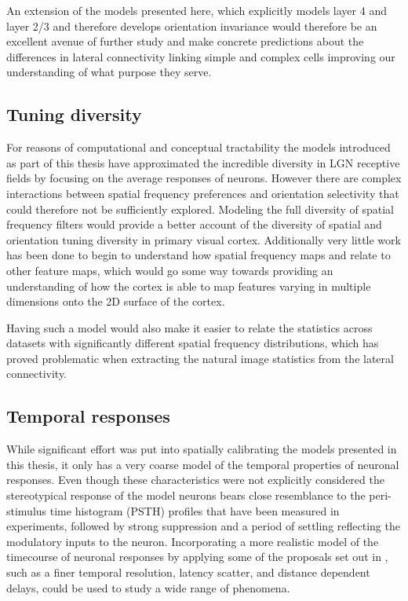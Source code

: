 An extension of the models presented here, which explicitly models
layer 4 and layer 2/3 and therefore develops orientation invariance
would therefore be an excellent avenue of further study and make
concrete predictions about the differences in lateral connectivity
linking simple and complex cells improving our understanding of what
purpose they serve.

\subsection{Tuning diversity}

For reasons of computational and conceptual tractability the models
introduced as part of this thesis have approximated the incredible
diversity in LGN receptive fields by focusing on the average responses
of neurons. However there are complex interactions between spatial
frequency preferences and orientation selectivity that could therefore
not be sufficiently explored. Modeling the full diversity of spatial
frequency filters would provide a better account of the diversity of
spatial and orientation tuning diversity in primary visual
cortex. Additionally very little work has been done to begin to
understand how spatial frequency maps and relate to other feature
maps, which would go some way towards providing an understanding of
how the cortex is able to map features varying in multiple dimensions
onto the 2D surface of the cortex.

Having such a model would also make it easier to relate the statistics
across datasets with significantly different spatial frequency
distributions, which has proved problematic when extracting the
natural image statistics from the lateral connectivity.

\subsection{Temporal responses}

While significant effort was put into spatially calibrating the models
presented in this thesis, it only has a very coarse model of the
temporal properties of neuronal responses. Even though these
characteristics were not explicitly considered the stereotypical
response of the model neurons bears close resemblance to the
peri-stimulus time histogram (PSTH) profiles that have been measured
in experiments, followed by strong suppression and a period of
settling reflecting the modulatory inputs to the neuron. Incorporating
a more realistic model of the timecourse of neuronal responses by
applying some of the proposals set out in \cite{Stevens2016}, such as
a finer temporal resolution, latency scatter, and distance dependent
delays, could be used to study a wide range of phenomena.

